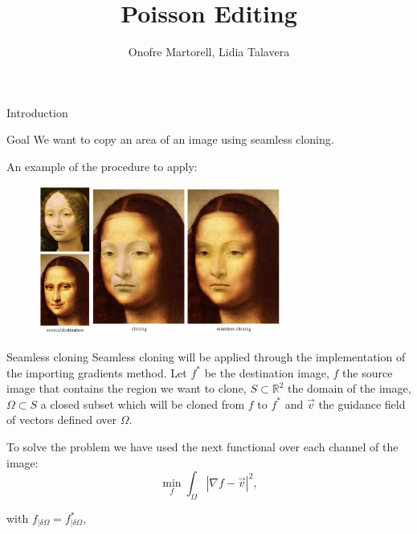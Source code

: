 \documentclass[11pt]{beamer}
\author{Onofre Martorell, Lidia Talavera}
\title{Poisson Editing}
\begin{document}
\begin{frame}
\titlepage
\end{frame}


\begin{frame}{Introduction}
\begin{block}{Goal}
We want to copy an area of an image using seamless cloning.
\end{block}

An example of the procedure to apply:

\begin{figure}
    \centering
    \includegraphics[width=80mm]{Example.png}
\end{figure}
\end{frame}

\begin{frame}{Seamless cloning}
Seamless cloning will be applied through the implementation of the importing gradients method. Let $f^{*}$ be the destination image, $f$ the source image that contains the region we want to clone,  $S \subset \mathbb{R}^{2}$ the domain of the image, $\Omega \subset  S$ a closed subset which will be cloned from $f$ to $f^{*}$  and $\overrightarrow{v}$ the guidance field of vectors defined over $\Omega$.\newline

To solve the problem we have used the next functional over each channel of the image:
\begin{equation}
\min_{f}\int_{\Omega }\left | \nabla f-\overrightarrow{v} \right |^{2},
\label{eq:functional}
\end{equation}

with $f_{\mid \delta \Omega}=f_{\mid \delta \Omega}^{*}$, \newline
\end{frame}
\end{document}
